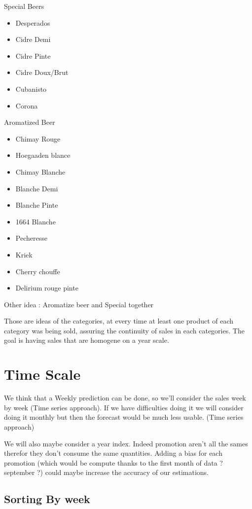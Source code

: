 \documentclass{report}
\begin{document}
Special Beers 
\begin{itemize}
\item Desperados
\item Cidre Demi
\item Cidre Pinte
\item Cidre Doux/Brut
\item Cubanisto
\item Corona
\end{itemize}

Aromatized Beer
\begin{itemize}
\item Chimay Rouge
\item Hoegaaden blance
\item Chimay Blanche
\item Blanche Demi
\item Blanche Pinte
\item 1664 Blanche
\item Pecheresse
\item Kriek
\item Cherry chouffe
\item Delirium rouge pinte
\end{itemize}

Other idea : Aromatize beer and Special together

Those are ideas of the categories, at every time at least one product of each category was being sold, assuring the continuity of sales in each categories. The goal is having sales that are homogene on a year scale.

\section{Time Scale}

We think that a Weekly prediction can be done, so we'll consider the sales week by week (Time series approach). If we have difficulties doing it we will consider doing it monthly but then the forecast would be much less usable. (Time series approach)

We will also maybe consider a year index. Indeed promotion aren't all the sames therefor they don't consume the same quantities. Adding a bias for each promotion (which would be compute thanks to the first month of data ? september ?) could maybe increase the accuracy of our estimations.
\subsection{Sorting By week}
\end{document}
